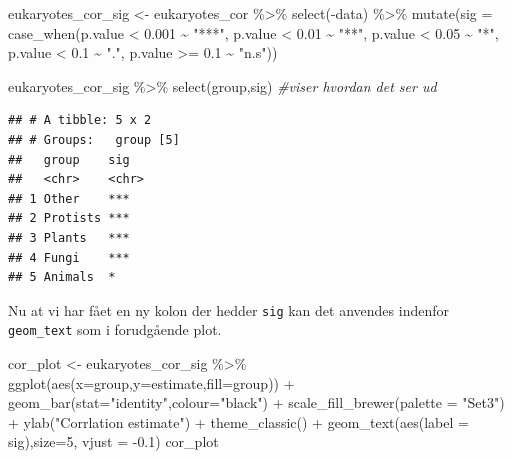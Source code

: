 \documentclass[
]{book}
\newenvironment{Shaded}{\begin{snugshade}}{\end{snugshade}}
\newcommand{\AttributeTok}[1]{\textcolor[rgb]{0.77,0.63,0.00}{#1}}
\newcommand{\CommentTok}[1]{\textcolor[rgb]{0.56,0.35,0.01}{\textit{#1}}}
\newcommand{\DecValTok}[1]{\textcolor[rgb]{0.00,0.00,0.81}{#1}}
\newcommand{\FloatTok}[1]{\textcolor[rgb]{0.00,0.00,0.81}{#1}}
\newcommand{\FunctionTok}[1]{\textcolor[rgb]{0.00,0.00,0.00}{#1}}
\newcommand{\NormalTok}[1]{#1}
\newcommand{\OtherTok}[1]{\textcolor[rgb]{0.56,0.35,0.01}{#1}}
\newcommand{\SpecialCharTok}[1]{\textcolor[rgb]{0.00,0.00,0.00}{#1}}
\newcommand{\StringTok}[1]{\textcolor[rgb]{0.31,0.60,0.02}{#1}}
\begin{document}
\begin{Shaded}
\begin{Highlighting}[]
\NormalTok{eukaryotes\_cor\_sig }\OtherTok{\textless{}{-}}\NormalTok{ eukaryotes\_cor }\SpecialCharTok{\%\textgreater{}\%}
  \FunctionTok{select}\NormalTok{(}\SpecialCharTok{{-}}\NormalTok{data) }\SpecialCharTok{\%\textgreater{}\%} 
  \FunctionTok{mutate}\NormalTok{(}\AttributeTok{sig =} \FunctionTok{case\_when}\NormalTok{(p.value }\SpecialCharTok{\textless{}} \FloatTok{0.001} \SpecialCharTok{\textasciitilde{}} \StringTok{"***"}\NormalTok{,}
\NormalTok{                         p.value }\SpecialCharTok{\textless{}} \FloatTok{0.01} \SpecialCharTok{\textasciitilde{}} \StringTok{"**"}\NormalTok{,}
\NormalTok{                         p.value }\SpecialCharTok{\textless{}} \FloatTok{0.05} \SpecialCharTok{\textasciitilde{}} \StringTok{"*"}\NormalTok{,}
\NormalTok{                         p.value }\SpecialCharTok{\textless{}} \FloatTok{0.1} \SpecialCharTok{\textasciitilde{}} \StringTok{"."}\NormalTok{,}
\NormalTok{                         p.value }\SpecialCharTok{\textgreater{}=} \FloatTok{0.1} \SpecialCharTok{\textasciitilde{}} \StringTok{"n.s"}\NormalTok{))}

\NormalTok{eukaryotes\_cor\_sig }\SpecialCharTok{\%\textgreater{}\%} \FunctionTok{select}\NormalTok{(group,sig) }\CommentTok{\#viser hvordan det ser ud}
\end{Highlighting}
\end{Shaded}

\begin{verbatim}
## # A tibble: 5 x 2
## # Groups:   group [5]
##   group    sig  
##   <chr>    <chr>
## 1 Other    ***  
## 2 Protists ***  
## 3 Plants   ***  
## 4 Fungi    ***  
## 5 Animals  *
\end{verbatim}

Nu at vi har fået en ny kolon der hedder \texttt{sig} kan det anvendes indenfor \texttt{geom\_text} som i forudgående plot.

\begin{Shaded}
\begin{Highlighting}[]
\NormalTok{cor\_plot }\OtherTok{\textless{}{-}}\NormalTok{ eukaryotes\_cor\_sig }\SpecialCharTok{\%\textgreater{}\%}
  \FunctionTok{ggplot}\NormalTok{(}\FunctionTok{aes}\NormalTok{(}\AttributeTok{x=}\NormalTok{group,}\AttributeTok{y=}\NormalTok{estimate,}\AttributeTok{fill=}\NormalTok{group)) }\SpecialCharTok{+} 
  \FunctionTok{geom\_bar}\NormalTok{(}\AttributeTok{stat=}\StringTok{"identity"}\NormalTok{,}\AttributeTok{colour=}\StringTok{"black"}\NormalTok{) }\SpecialCharTok{+}
  \FunctionTok{scale\_fill\_brewer}\NormalTok{(}\AttributeTok{palette =} \StringTok{"Set3"}\NormalTok{) }\SpecialCharTok{+} 
  \FunctionTok{ylab}\NormalTok{(}\StringTok{"Corrlation estimate"}\NormalTok{) }\SpecialCharTok{+}
  \FunctionTok{theme\_classic}\NormalTok{()  }\SpecialCharTok{+} 
  \FunctionTok{geom\_text}\NormalTok{(}\FunctionTok{aes}\NormalTok{(}\AttributeTok{label =}\NormalTok{ sig),}\AttributeTok{size=}\DecValTok{5}\NormalTok{, }\AttributeTok{vjust =} \SpecialCharTok{{-}}\FloatTok{0.1}\NormalTok{)}
\NormalTok{cor\_plot}
\end{Highlighting}
\end{Shaded}
\end{document}
